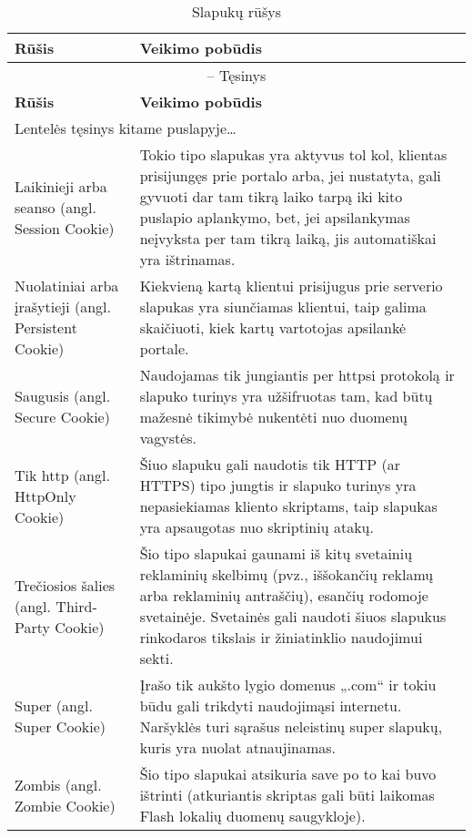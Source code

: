 \documentclass[12pt,a4paper,titlepage]{article}
\begin{document}
\begin{longtable}{|p{4cm}|p{8.8cm}|}
\caption{Slapukų rūšys \label{table:slapuku_rušys}}\\

\hline \hline
{\textbf{Rūšis}} &
{\textbf{Veikimo pobūdis}}\\
\hline
\endfirsthead


\multicolumn{2}{c}{{\tablename} \thetable{} -- Tęsinys} \\[0.5ex]
\hline \hline
{\textbf{Rūšis}} &
{\textbf{Veikimo pobūdis}}\\
\hline
\endhead


\multicolumn{2}{l}{{Lentelės tęsinys kitame puslapyje\ldots}} \\
\endfoot


\hline \hline
\endlastfoot
\hline 
Laikinieji arba seanso  (angl. Session Cookie)
&
Tokio tipo slapukas yra aktyvus tol kol, klientas prisijungęs prie portalo arba, jei nustatyta, gali gyvuoti dar tam tikrą laiko tarpą iki kito puslapio aplankymo, bet, jei apsilankymas neįvyksta per tam tikrą laiką, jis automatiškai yra ištrinamas.
\\
\hline
Nuolatiniai arba įrašytieji (angl. Persistent Cookie)
&
Kiekvieną kartą klientui prisijugus prie serverio slapukas yra siunčiamas klientui, taip galima skaičiuoti, kiek kartų vartotojas apsilankė portale.
\\
\hline
Saugusis (angl. Secure Cookie)
&
Naudojamas tik jungiantis per httpsi protokolą ir slapuko turinys yra užšifruotas tam, kad būtų mažesnė tikimybė nukentėti nuo duomenų vagystės.
\\
\hline
Tik http (angl. HttpOnly Cookie)
&
Šiuo slapuku gali naudotis tik HTTP (ar HTTPS) tipo jungtis ir slapuko turinys yra nepasiekiamas kliento skriptams, taip slapukas yra apsaugotas nuo skriptinių atakų.
\\
\hline
Trečiosios šalies (angl. Third-Party Cookie)
&
Šio tipo slapukai gaunami iš kitų svetainių reklaminių skelbimų (pvz., iššokančių reklamų arba reklaminių antraščių), esančių rodomoje svetainėje. Svetainės gali naudoti šiuos slapukus rinkodaros tikslais ir žiniatinklio naudojimui sekti.
\\
\hline
Super (angl. Super Cookie)
&
Įrašo tik aukšto lygio domenus „.com“ ir tokiu būdu gali trikdyti naudojimąsi internetu. Naršyklės turi sąrašus neleistinų super slapukų, kuris yra nuolat atnaujinamas.
\\
\hline
Zombis (angl. Zombie Cookie)
&
Šio tipo slapukai atsikuria save po to kai buvo ištrinti (atkuriantis skriptas gali būti laikomas Flash lokalių duomenų saugykloje).
\end{longtable}
\end{document}
